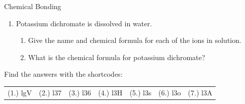 \begin{eocexercises}{Chemical Bonding}
\begin{enumerate}[noitemsep, label=\textbf{\arabic*}. ]
              \label{m38689*uid185}\item Potassium dichromate is dissolved in water.
\label{m38689*id148361}\begin{enumerate}[noitemsep, label=\textbf{\alph*}. ] 
            \label{m38689*uid186}\item Give the name and chemical formula for each of the ions in solution.
\label{m38689*uid187}\item What is the chemical formula for potassium dichromate?
\end{enumerate}
                \end{enumerate}
  \label{m38689**end}
  \label{6cd7661dc7a31822d94f8eef4ac8e3a5**end}
\par {} Find the answers with the shortcodes:
 \par \begin{tabular}[h]{cccccc}
 (1.) lgV  &  (2.) l37  &  (3.) l36  &  (4.) l3H  &  (5.) l3s  &  (6.) l3o  &  (7.) l3A  & \end{tabular}
\end{eocexercises}
